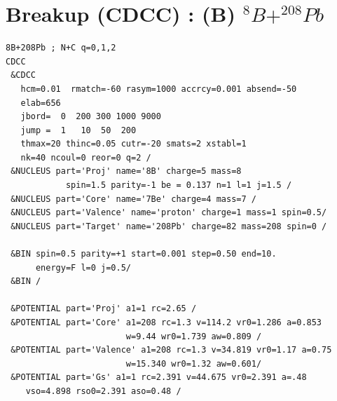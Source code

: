 \documentclass[11pt]{book}
\begin{document}
\section{Breakup (CDCC) : (B) $^8B+^{208}Pb$}
\begin{small}  
\begin{lstlisting}[frame=single]
8B+208Pb ; N+C q=0,1,2
CDCC
 &CDCC
   hcm=0.01  rmatch=-60 rasym=1000 accrcy=0.001 absend=-50
   elab=656 
   jbord=  0  200 300 1000 9000
   jump =  1   10  50  200
   thmax=20 thinc=0.05 cutr=-20 smats=2 xstabl=1
   nk=40 ncoul=0 reor=0 q=2 /
 &NUCLEUS part='Proj' name='8B' charge=5 mass=8 
    		spin=1.5 parity=-1 be = 0.137 n=1 l=1 j=1.5 /
 &NUCLEUS part='Core' name='7Be' charge=4 mass=7 /
 &NUCLEUS part='Valence' name='proton' charge=1 mass=1 spin=0.5/
 &NUCLEUS part='Target' name='208Pb' charge=82 mass=208 spin=0 /
 
 &BIN spin=0.5 parity=+1 start=0.001 step=0.50 end=10. 
      energy=F l=0 j=0.5/
 &BIN /

 &POTENTIAL part='Proj' a1=1 rc=2.65 /
 &POTENTIAL part='Core' a1=208 rc=1.3 v=114.2 vr0=1.286 a=0.853 
                        w=9.44 wr0=1.739 aw=0.809 /
 &POTENTIAL part='Valence' a1=208 rc=1.3 v=34.819 vr0=1.17 a=0.75 
                        w=15.340 wr0=1.32 aw=0.601/
 &POTENTIAL part='Gs' a1=1 rc=2.391 v=44.675 vr0=2.391 a=.48 
	vso=4.898 rso0=2.391 aso=0.48 /
\end{lstlisting}
\end{small} 
\end{document}

